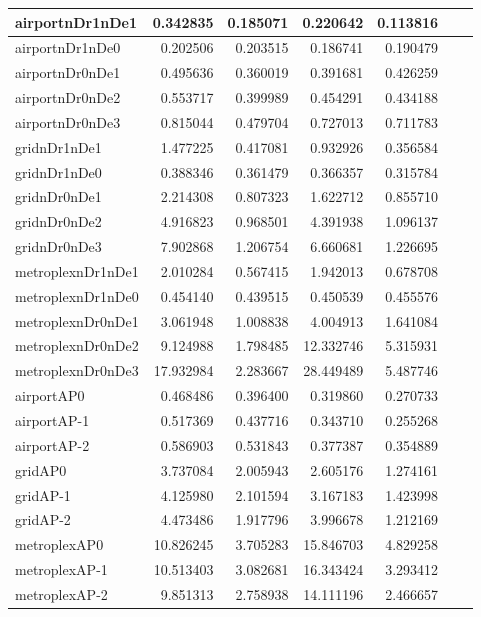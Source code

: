\begin{longtable}{|l|r|r|r|r|r|r|}
\endlastfoot
airportnDr1nDe1 & 0.342835 & 0.185071 & 0.220642 & 0.113816 \\ \hline
airportnDr1nDe0 & 0.202506 & 0.203515 & 0.186741 & 0.190479 \\ \hline
airportnDr0nDe1 & 0.495636 & 0.360019 & 0.391681 & 0.426259 \\ \hline
airportnDr0nDe2 & 0.553717 & 0.399989 & 0.454291 & 0.434188 \\ \hline
airportnDr0nDe3 & 0.815044 & 0.479704 & 0.727013 & 0.711783 \\ \hline
gridnDr1nDe1 & 1.477225 & 0.417081 & 0.932926 & 0.356584 \\ \hline
gridnDr1nDe0 & 0.388346 & 0.361479 & 0.366357 & 0.315784 \\ \hline
gridnDr0nDe1 & 2.214308 & 0.807323 & 1.622712 & 0.855710 \\ \hline
gridnDr0nDe2 & 4.916823 & 0.968501 & 4.391938 & 1.096137 \\ \hline
gridnDr0nDe3 & 7.902868 & 1.206754 & 6.660681 & 1.226695 \\ \hline
metroplexnDr1nDe1 & 2.010284 & 0.567415 & 1.942013 & 0.678708 \\ \hline
metroplexnDr1nDe0 & 0.454140 & 0.439515 & 0.450539 & 0.455576 \\ \hline
metroplexnDr0nDe1 & 3.061948 & 1.008838 & 4.004913 & 1.641084 \\ \hline
metroplexnDr0nDe2 & 9.124988 & 1.798485 & 12.332746 & 5.315931 \\ \hline
metroplexnDr0nDe3 & 17.932984 & 2.283667 & 28.449489 & 5.487746 \\ \hline
airportAP0 & 0.468486 & 0.396400 & 0.319860 & 0.270733 \\ \hline
airportAP-1 & 0.517369 & 0.437716 & 0.343710 & 0.255268 \\ \hline
airportAP-2 & 0.586903 & 0.531843 & 0.377387 & 0.354889 \\ \hline
gridAP0 & 3.737084 & 2.005943 & 2.605176 & 1.274161 \\ \hline
gridAP-1 & 4.125980 & 2.101594 & 3.167183 & 1.423998 \\ \hline
gridAP-2 & 4.473486 & 1.917796 & 3.996678 & 1.212169 \\ \hline
metroplexAP0 & 10.826245 & 3.705283 & 15.846703 & 4.829258 \\ \hline
metroplexAP-1 & 10.513403 & 3.082681 & 16.343424 & 3.293412 \\ \hline
metroplexAP-2 & 9.851313 & 2.758938 & 14.111196 & 2.466657 \\ \hline

\end{longtable}
